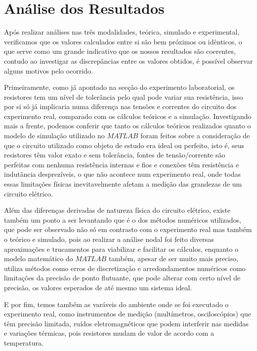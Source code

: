 \newpage
\section{Análise dos Resultados}

Após realizar análises nas três modalidades, teórica, simulado e experimental, verificamos que os valores calculados entre si são bem próximos ou idênticos, o que serve como um grande indicativo que os nossos resultados são coerentes, contudo ao investigar as discrepâncias entre os valores obtidos, é possível observar alguns motivos pelo ocorrido. 

Primeiramente, como já apontado na secção do experimento laboratorial, os resistores tem um nível de tolerância pelo qual pode variar sua resistência, isso por si só já implicaria numa diferença nas tensões e correntes do circuito dos experimento real, comparado com os cálculos teóricos e a simulação. Investigando mais a frente, podemos conferir que tanto os cálculos teóricos realizados quanto o modelo de simulação utilizado no \(MATLAB\) foram feitos sobre a consideração de que o circuito utilizado como objeto de estudo era ideal ou perfeito, isto é, seus resistores têm valor exato e sem tolerância, fontes de tensão/corrente são perfeitas com nenhuma resistência internas e fios e conexões têm resistência e indutância desprezíveis, o que não acontece num experimento real, onde todas essas limitações físicas inevitavelmente afetam a medição das grandezas de um circuito elétrico.

Além das diferenças derivadas de natureza física do circuito elétrico, existe também um ponto a ser levantando que é o dos métodos numéricos utilizados, que pode ser observado não só em contrasto com o experimento real mas também o teórico e simulado, pois ao realizar a análise nodal foi feito diversas aproximações e trucamentos para viabilizar e facilitar os cálculos, enquanto o modelo matemático do \(MATLAB\) também, apesar de ser muito mais preciso, utiliza métodos como erros de discretização e arredondamentos numéricos como limitações da precisão de ponto flutuante, que pode alterar com certo nível de precisão, os valores esperados de até mesmo um sistema ideal. 

E por fim, temos também as varáveis do ambiente onde se foi executado o experimento real, como instrumentos de medição (multímetros, osciloscópios) que têm precisão limitada, ruídos eletromagnéticos que podem interferir nas medidas e variações térmicas, pois resistores mudam de valor de acordo com a temperatura.